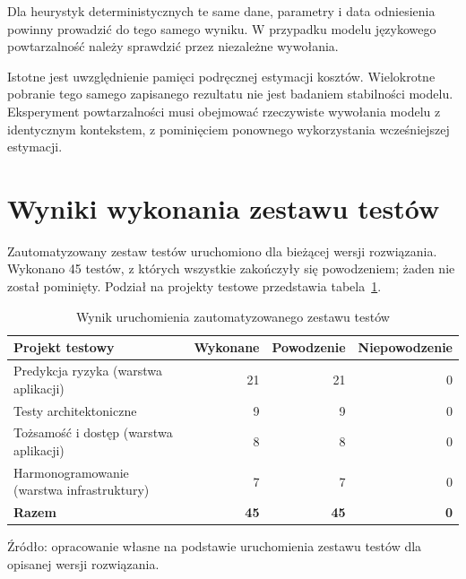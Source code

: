 Dla heurystyk deterministycznych te same dane, parametry i data odniesienia powinny prowadzić do tego samego wyniku. W przypadku modelu językowego powtarzalność należy sprawdzić przez niezależne wywołania.

Istotne jest uwzględnienie pamięci podręcznej estymacji kosztów. Wielokrotne pobranie tego samego zapisanego rezultatu nie jest badaniem stabilności modelu. Eksperyment powtarzalności musi obejmować rzeczywiste wywołania modelu z identycznym kontekstem, z pominięciem ponownego wykorzystania wcześniejszej estymacji.


\section{Wyniki wykonania zestawu testów}
\label{sec:wyniki-testow}

Zautomatyzowany zestaw testów uruchomiono dla bieżącej wersji rozwiązania. Wykonano 45 testów, z których wszystkie zakończyły się powodzeniem; żaden nie został pominięty. Podział na projekty testowe przedstawia tabela~\ref{tab:wyniki-testow}.

\begin{table}[htbp]
    \centering
    \small
    \caption{Wynik uruchomienia zautomatyzowanego zestawu testów}
    \label{tab:wyniki-testow}
    \begin{tabularx}{\textwidth}{@{}Xrrr@{}}
        \toprule
        \textbf{Projekt testowy} & \textbf{Wykonane} & \textbf{Powodzenie} & \textbf{Niepowodzenie} \\
        \midrule
        Predykcja ryzyka (warstwa aplikacji) & 21 & 21 & 0 \\
        Testy architektoniczne & 9 & 9 & 0 \\
        Tożsamość i dostęp (warstwa aplikacji) & 8 & 8 & 0 \\
        Harmonogramowanie (warstwa infrastruktury) & 7 & 7 & 0 \\
        \midrule
        \textbf{Razem} & \textbf{45} & \textbf{45} & \textbf{0} \\
        \bottomrule
    \end{tabularx}

    \par\smallskip
    \begin{minipage}{\textwidth}
        \footnotesize
        Źródło: opracowanie własne na podstawie uruchomienia zestawu testów
        dla opisanej wersji rozwiązania.
    \end{minipage}
\end{table}


